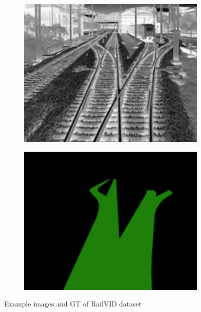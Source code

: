 \begin{figure}[H]
\begin{subfigure}{0.24\textwidth}
        \includegraphics[width=\linewidth]{PICs/railVID_switch.png}
    \end{subfigure}
    \hfill
    \begin{subfigure}{0.24\textwidth}
        \centering
        \includegraphics[width=\linewidth]{PICs/railVID_switch_label.png}
    \end{subfigure}
    \caption{Example images and \ac{GT} of RailVID dataset \cite{yuan2022railvid}}
    \label{fig:railVID_dataset_images}
\end{figure}


